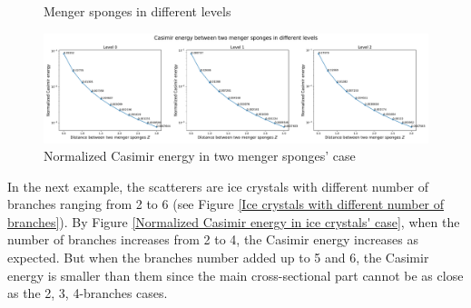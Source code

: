 \begin{figure}[H]
    \centering
    \qquad
    \qquad
    \caption{Menger sponges in different levels}
    \label{Menger sponges}
\end{figure}

\begin{figure}[H]
    \centering
    \hspace*{-1.5cm}\includegraphics[width=1.2\textwidth]{figures/Cas_menger_spongers.pdf}
    \caption{Normalized Casimir energy in two menger sponges' case}
    \label{Normalized Casimir energy in two menger sponges' case}
\end{figure}
In the next example, the scatterers are ice crystals with different number of branches ranging from 2 to 6 (see Figure \ref{Ice crystals with different number of branches}).
By Figure \ref{Normalized Casimir energy in ice crystals' case}, when the number of branches increases from 2 to 4, the Casimir energy increases as expected. But 
when the branches number added up to 5 and 6, the Casimir energy is smaller than them since the main cross-sectional part cannot be as close as the 
2, 3, 4-branches cases. 

